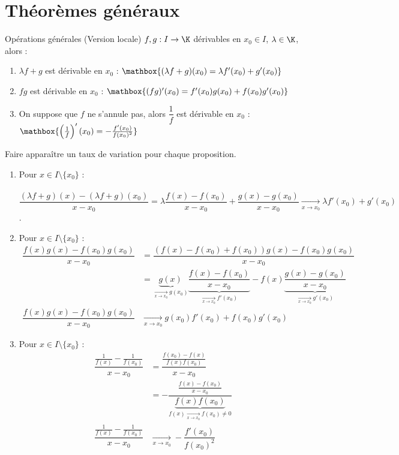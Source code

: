 \documentclass[12pt,a4paper]{report}
\begin{document}
\section{Théorèmes généraux}
\begin{theoreme}{Opérations générales (Version locale)}{}
$f,g : I \to \K$ dérivables en $x_0 \in I$, $\lambda \in \K$, alors : 
\begin{enumerate}
    \item $\lambda f+g$ est dérivable en $x_0$ :
    $\mathbox{(\lambda f + g) ( x_0) =\lambda f'(x_0)+g'(x_0)}$
    \item $fg$ est dérivable en $x_0$ : 
    $\mathbox{(fg)'(x_0)=f'(x_0)g(x_0)+f(x_0)g'(x_0)}$
    \item On suppose que $f$ ne s'annule pas, alors $\dfrac{1}{f}$ est dérivable en $x_0$ : 
    $\mathbox{\left(\frac{1}{f}\right)'(x_0)= - \frac{f'(x_0)}{f(x_0)^2}}$
\end{enumerate}
\end{theoreme}

\begin{principedemo}{}
Faire apparaître un taux de variation pour chaque proposition.
\end{principedemo}

\begin{demo}{}
\begin{enumerate}
	\item Pour $x \in I \setminus \{x_0 \}$ : \\ \\
	$\dfrac{(\lambda f+g)(x) - (\lambda f+g)(x_0)}{x-x_0} = \lambda \dfrac{f(x)-f(x_0)}{x-x_0} + \dfrac{g(x)-g(x_0)}{x-x_0} \xrightarrow[x \to x_0]{} \lambda f'(x_0) + g'(x_0)$. \\
	
	\item Pour $x \in I \setminus \{x_0\}$ :
	\begin{align*}
	\dfrac{f(x)g(x)-f(x_0)g(x_0)}{x-x_0} &= \dfrac{(f(x)-f(x_0)+f(x_0))g(x) - f(x_0)g(x_0)}{x-x_0} \\
	&= \underbrace{g(x)}_{\xrightarrow[x \to x_0]{} g(x_0)} \underbrace{\dfrac{f(x)-f(x_0)}{x-x_0}}_{\xrightarrow[x \to x_0]{} f'(x_0)} - f(x) \underbrace{\dfrac{g(x)-g(x_0)}{x-x_0}}_{\xrightarrow[x \to x_0]{} g'(x_0)} \\
	\dfrac{f(x)g(x)-f(x_0)g(x_0)}{x-x_0} & \xrightarrow[x \to x_0]{} g(x_0)f'(x_0)+f(x_0)g'(x_0)
	\end{align*}
	
	\item Pour $x \in I \setminus \{ x_0\}$ :
	\begin{align*}
	\dfrac{\frac{1}{f(x)} - \frac{1}{f(x_0)}}{x-x_0} &= \dfrac{\frac{f(x_0)-f(x)}{f(x)f(x_0)}}{x-x_0} \\
	&= - \dfrac{\frac{f(x)-f(x_0)}{x-x_0}}{\underbrace{f(x)f(x_0)}_{f(x) \xrightarrow[x \to x_0]{} f(x_0) \neq 0}} \\
	\dfrac{\frac{1}{f(x)} - \frac{1}{f(x_0)}}{x-x_0} & \xrightarrow[x \to x_0]{} - \dfrac{f'(x_0)}{f(x_0)^2}
	\end{align*}
	
\end{enumerate}
\end{demo}
\end{document}

